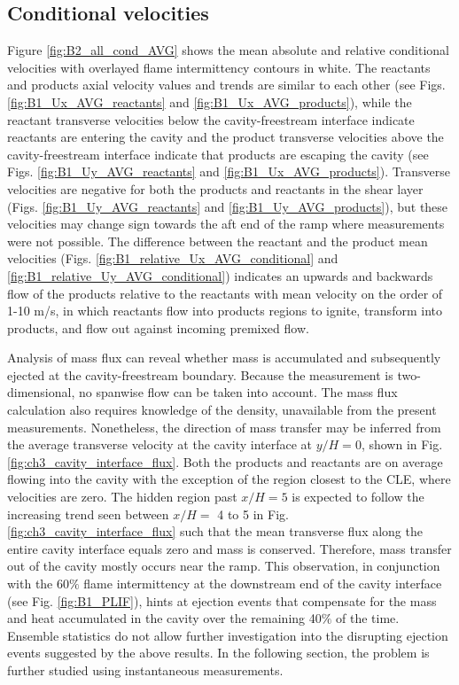 \subsection*{Conditional velocities}\label{sec:ch3_cond_vel}
Figure \ref{fig:B2_all_cond_AVG} shows the mean absolute and relative conditional velocities with overlayed flame intermittency contours in white. The reactants and products axial velocity values and trends are similar to each other (see Figs. \ref{fig:B1_Ux_AVG_reactants} and \ref{fig:B1_Ux_AVG_products}), while the reactant transverse velocities below the cavity-freestream interface indicate reactants are entering the cavity and the product transverse velocities above the cavity-freestream interface indicate that products are escaping the cavity (see Figs. \ref{fig:B1_Uy_AVG_reactants} and \ref{fig:B1_Ux_AVG_products}). Transverse velocities are negative for both the products and reactants in the shear layer (Figs. \ref{fig:B1_Uy_AVG_reactants} and \ref{fig:B1_Uy_AVG_products}), but these velocities may change sign towards the aft end of the ramp where measurements were not possible. The difference between the reactant and the product mean velocities (Figs. \ref{fig:B1_relative_Ux_AVG_conditional} and \ref{fig:B1_relative_Uy_AVG_conditional}) indicates an upwards and backwards flow of the products relative to the reactants with mean velocity on the order of 1-10 m/s, in which reactants flow into products regions to ignite, transform into products, and flow out against incoming premixed flow.

Analysis of mass flux can reveal whether mass is accumulated and subsequently ejected at the cavity-freestream boundary. Because the measurement is two-dimensional, no spanwise flow can be taken into account.  The mass flux calculation also requires knowledge of the density, unavailable from the present measurements. Nonetheless, the direction of mass transfer may be inferred from the average transverse velocity at the cavity interface at $y/H=0$, shown in Fig. \ref{fig:ch3_cavity_interface_flux}. 
Both the products and reactants are on average flowing into the cavity with the exception of the region closest to the CLE, where velocities are zero. The hidden region past $x/H=5$ is expected to follow the increasing trend seen between $x/H=$ 4 to 5 in Fig. \ref{fig:ch3_cavity_interface_flux} such that the mean transverse flux along the entire cavity interface equals zero and mass is conserved. Therefore, mass transfer out of the cavity mostly occurs near the ramp. This observation, in conjunction with the 60$\%$ flame intermittency at the downstream end of the cavity interface (see Fig. \ref{fig:B1_PLIF}), hints at ejection events that compensate for the mass and heat accumulated in the cavity over the remaining 40$\%$ of the time. Ensemble statistics do not allow further investigation into the disrupting ejection events suggested by the above results. In the following section, the problem is further studied using instantaneous measurements.

